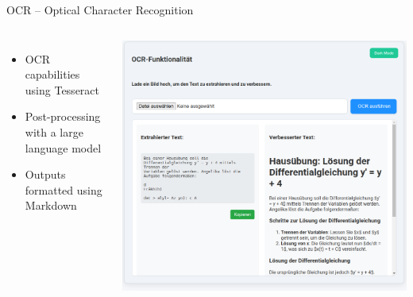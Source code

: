 \documentclass{beamer}
\begin{document}
\begin{frame}{OCR – Optical Character Recognition}
  \begin{columns}
      \begin{itemize}
        \item OCR capabilities using Tesseract
        \item Post-processing with a large language model
        \item Outputs formatted using Markdown
      \end{itemize}
      \centering
      \includegraphics[width=\textwidth]{OCR-functonalatie.png}
  \end{columns}
\end{frame}
\end{document}
